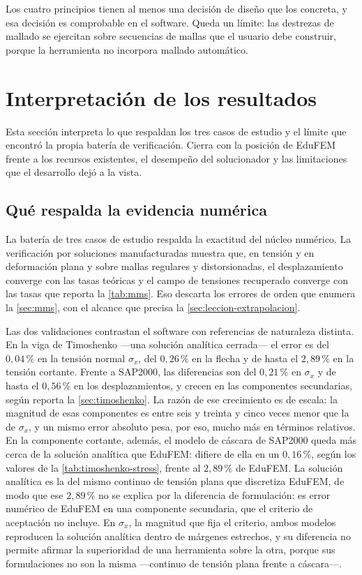 Los cuatro principios tienen al menos una decisión de diseño que los concreta, y esa decisión es comprobable en el software. Queda un límite: las destrezas de mallado se ejercitan sobre secuencias de mallas que el usuario debe construir, porque la herramienta no incorpora mallado automático.

\section{Interpretación de los resultados}
\label{sec:interpretacion}

Esta sección interpreta lo que respaldan los tres casos de estudio y el límite que encontró la propia batería de verificación. Cierra con la posición de EduFEM frente a los recursos existentes, el desempeño del solucionador y las limitaciones que el desarrollo dejó a la vista.

\subsection{Qué respalda la evidencia numérica}

La batería de tres casos de estudio respalda la exactitud del núcleo numérico. La verificación por soluciones manufacturadas muestra que, en tensión y en deformación plana y sobre mallas regulares y distorsionadas, el desplazamiento converge con las tasas teóricas y el campo de tensiones recuperado converge con las tasas que reporta la \autoref{tab:mms}. Eso descarta los errores de orden que enumera la \autoref{sec:mms}, con el alcance que precisa la \autoref{sec:leccion-extrapolacion}.

Las dos validaciones contrastan el software con referencias de naturaleza distinta. En la viga de Timoshenko —una solución analítica cerrada— el error es del $0{,}04\,\%$ en la tensión normal $\sigma_x$, del $0{,}26\,\%$ en la flecha y de hasta el $2{,}89\,\%$ en la tensión cortante. Frente a SAP2000, las diferencias son del $0{,}21\,\%$ en $\sigma_x$ y de hasta el $0{,}56\,\%$ en los desplazamientos, y crecen en las componentes secundarias, según reporta la \autoref{sec:timoshenko}. La razón de ese crecimiento es de escala: la magnitud de esas componentes es entre seis y treinta y cinco veces menor que la de $\sigma_x$, y un mismo error absoluto pesa, por eso, mucho más en términos relativos. En la componente cortante, además, el modelo de cáscara de SAP2000 queda más cerca de la solución analítica que EduFEM: difiere de ella en un $0{,}16\,\%$, según los valores de la \autoref{tab:timoshenko-stress}, frente al $2{,}89\,\%$ de EduFEM. La solución analítica es la del mismo continuo de tensión plana que discretiza EduFEM, de modo que ese $2{,}89\,\%$ no se explica por la diferencia de formulación: es error numérico de EduFEM en una componente secundaria, que el criterio de aceptación no incluye. En $\sigma_x$, la magnitud que fija el criterio, ambos modelos reproducen la solución analítica dentro de márgenes estrechos, y su diferencia no permite afirmar la superioridad de una herramienta sobre la otra, porque sus formulaciones no son la misma ---continuo de tensión plana frente a cáscara---.

